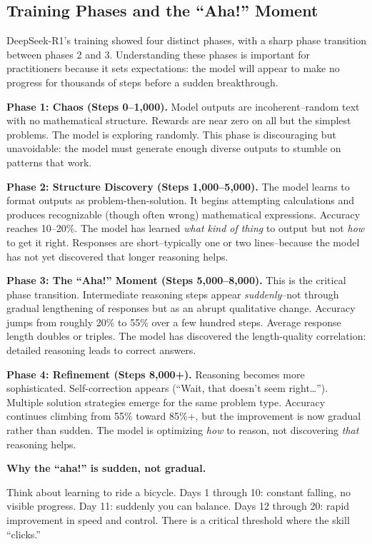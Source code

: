 \begin{chapterenv}
\section{Training Phases and the ``Aha!'' Moment}

DeepSeek-R1's training showed four distinct phases, with a sharp phase transition between phases 2 and 3. Understanding these phases is important for practitioners because it sets expectations: the model will appear to make no progress for thousands of steps before a sudden breakthrough.

\textbf{Phase 1: Chaos (Steps 0--1,000).} Model outputs are incoherent--random text with no mathematical structure. Rewards are near zero on all but the simplest problems. The model is exploring randomly. This phase is discouraging but unavoidable: the model must generate enough diverse outputs to stumble on patterns that work.

\textbf{Phase 2: Structure Discovery (Steps 1,000--5,000).} The model learns to format outputs as problem-then-solution. It begins attempting calculations and produces recognizable (though often wrong) mathematical expressions. Accuracy reaches 10--20\%. The model has learned \textit{what kind of thing} to output but not \textit{how} to get it right. Responses are short--typically one or two lines--because the model has not yet discovered that longer reasoning helps.

\textbf{Phase 3: The ``Aha!'' Moment (Steps 5,000--8,000).} This is the critical phase transition. Intermediate reasoning steps appear \textit{suddenly}--not through gradual lengthening of responses but as an abrupt qualitative change. Accuracy jumps from roughly 20\% to 55\% over a few hundred steps. Average response length doubles or triples. The model has discovered the length-quality correlation: detailed reasoning leads to correct answers.

\textbf{Phase 4: Refinement (Steps 8,000+).} Reasoning becomes more sophisticated. Self-correction appears (``Wait, that doesn't seem right\ldots''). Multiple solution strategies emerge for the same problem type. Accuracy continues climbing from 55\% toward 85\%+, but the improvement is now gradual rather than sudden. The model is optimizing \textit{how} to reason, not discovering \textit{that} reasoning helps.

\begin{infobox}
\textbf{Why the ``aha!'' is sudden, not gradual.}

Think about learning to ride a bicycle. Days 1 through 10: constant falling, no visible progress. Day 11: suddenly you can balance. Days 12 through 20: rapid improvement in speed and control. There is a critical threshold where the skill ``clicks.''


\end{infobox}
\end{chapterenv}
